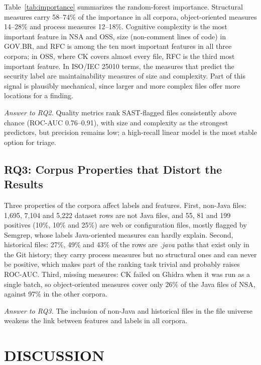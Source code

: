 \documentclass[a4paper,twoside]{article}
\begin{document}
Table~\ref{tab:importance} summarizes the random-forest importance. Structural measures carry 58--74\% of the importance in all corpora, object-oriented measures 14--28\% and process measures 12--18\%. Cognitive complexity is the most important feature in NSA and OSS, size (non-comment lines of code) in GOV.BR, and RFC is among the ten most important features in all three corpora; in OSS, where CK covers almost every file, RFC is the third most important feature. In ISO/IEC 25010 terms, the measures that predict the security label are maintainability measures of size and complexity. Part of this signal is plausibly mechanical, since larger and more complex files offer more locations for a finding.

\textit{Answer to RQ2.} Quality metrics rank SAST-flagged files consistently above chance (ROC-AUC 0.76--0.91), with size and complexity as the strongest predictors, but precision remains low; a high-recall linear model is the most stable option for triage.

\subsection{RQ3: Corpus Properties that Distort the Results}
\label{sec:rq3}

Three properties of the corpora affect labels and features. First, non-Java files: 1,695, 7,104 and 5,222 dataset rows are not Java files, and 55, 81 and 199 positives (10\%, 10\% and 25\%) are web or configuration files, mostly flagged by Semgrep, whose labels Java-oriented measures can hardly explain. Second, historical files: 27\%, 49\% and 43\% of the rows are \textit{.java} paths that exist only in the Git history; they carry process measures but no structural ones and can never be positive, which makes part of the ranking task trivial and probably raises ROC-AUC. Third, missing measures: CK failed on Ghidra when it was run as a single batch, so object-oriented measures cover only 26\% of the Java files of NSA, against 97\% in the other corpora.

\textit{Answer to RQ3.} The inclusion of non-Java and historical files in the file universe weakens the link between features and labels in all corpora.

\FloatBarrier
\section{\uppercase{Discussion}}
\label{sec:discussion}
\end{document}
